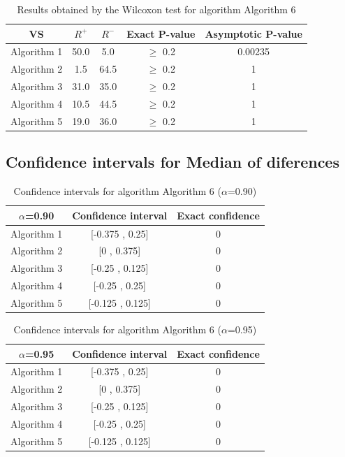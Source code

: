 \documentclass[a4paper,10pt]{article}
\begin{document}
\begin{table}[!htp]
\centering\small
\begin{tabular}{
|c|c|c|c|c|}
\hline
 VS & $R^{+}$ & $R^{-}$ & Exact P-value & Asymptotic P-value \\ \hline 
Algorithm 1 & 50.0 & 5.0 & $\geq$ 0.2 & 0.00235\\ \hline 
Algorithm 2 & 1.5 & 64.5 & $\geq$ 0.2 & 1\\ \hline 
Algorithm 3 & 31.0 & 35.0 & $\geq$ 0.2 & 1\\ \hline 
Algorithm 4 & 10.5 & 44.5 & $\geq$ 0.2 & 1\\ \hline 
Algorithm 5 & 19.0 & 36.0 & $\geq$ 0.2 & 1\\ \hline 

\end{tabular}
\caption{Results obtained by the Wilcoxon test for algorithm Algorithm 6}
\end{table}

\subsection{Confidence intervals for Median of diferences}

\begin{table}[!htp]
\centering\small
\begin{tabular}{
|c|c|c|}
\hline
 $\alpha$=0.90 & Confidence interval & Exact confidence \\ \hline 
Algorithm 1 & [-0.375 , 0.25] & 0\\ \hline 
Algorithm 2 & [0 , 0.375] & 0\\ \hline 
Algorithm 3 & [-0.25 , 0.125] & 0\\ \hline 
Algorithm 4 & [-0.25 , 0.25] & 0\\ \hline 
Algorithm 5 & [-0.125 , 0.125] & 0\\ \hline 

\end{tabular}
\caption{Confidence intervals for algorithm Algorithm 6 ($\alpha$=0.90)}
\end{table}
\begin{table}[!htp]
\centering\small
\begin{tabular}{
|c|c|c|}
\hline
 $\alpha$=0.95 & Confidence interval & Exact confidence \\ \hline 
Algorithm 1 & [-0.375 , 0.25] & 0\\ \hline 
Algorithm 2 & [0 , 0.375] & 0\\ \hline 
Algorithm 3 & [-0.25 , 0.125] & 0\\ \hline 
Algorithm 4 & [-0.25 , 0.25] & 0\\ \hline 
Algorithm 5 & [-0.125 , 0.125] & 0\\ \hline 

\end{tabular}
\caption{Confidence intervals for algorithm Algorithm 6 ($\alpha$=0.95)}
\end{table}

 \clearpage 
\end{document}
